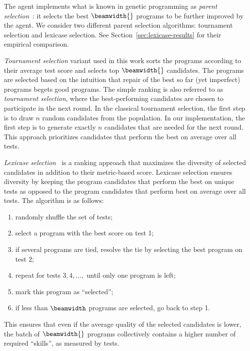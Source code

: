 The \rank{} agent implements what is known in genetic programming as \emph{parent selection}~\cite{koza1994:genetic}: it selects the best $\beamwidth{}$ programs to be further improved by the \debug{} agent.
We consider two different parent selection algorithms: tournament selection and lexicase selection. 
See Section~\ref{sec:lexicase-results} for their empirical comparison.

\emph{Tournament selection} variant used in this work sorts the programs according to their average test score and selects top $\beamwidth{}$ candidates. 
The programs are selected based on the intuition that repair of the best so far (yet imperfect) programs begets good programs. 
The simple ranking is also referred to as \emph{tournament selection}, where the best-performing candidates are chosen to participate in the next round.  
In the classical tournament selection, the first step is to draw $n$ random candidates from the population. 
In our implementation, the first step is to generate exactly $n$ candidates that are needed for the next round. 
This approach prioritizes candidates that perform the best on average over all tests.

\emph{Lexicase selection}~\cite{helmuth2015:solving} is a ranking approach that maximizes the diversity of selected candidates in addition to their metric-based score.
Lexicase selection ensures diversity by keeping the program candidates that perform the best on unique tests as opposed to the program candidates that perform best on average over all tests.
The algorithm is as follows:
\begin{enumerate}

\setlength{\parskip}{0pt}
\setlength\itemsep{0pt}

    \item randomly shuffle the set of tests;
    \item select a program with the best score on test 1;
    \item if several programs are tied, resolve the tie by selecting the best program on test 2;
    \item repeat for tests $3,4,\dots,$ until only one program is left;
    \item mark this program as ``selected'';
    \item if less than $\beamwidth$ programs are selected, go back to step 1.
\end{enumerate}
This ensures that even if the average quality of the selected candidates is lower, the batch of $\beamwidth{}$ programs collectively contains a higher number of required ``skills'', as measured by tests.



